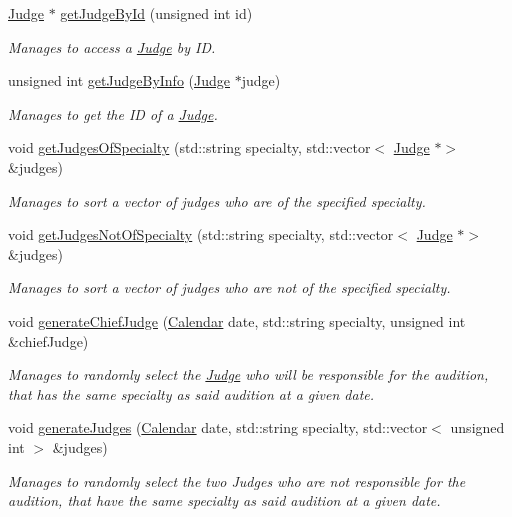 \begin{DoxyCompactItemize}
\hyperlink{class_judge}{Judge} $\ast$ \hyperlink{class_company_ab4135415448c7f20c5db91413ca947fd}{get\+Judge\+By\+Id} (unsigned int id)
\begin{DoxyCompactList}\small\item\em Manages to access a \hyperlink{class_judge}{Judge} by ID. \end{DoxyCompactList}\item 
unsigned int \hyperlink{class_company_a0ea843e026af967b2d4d69d268481cb7}{get\+Judge\+By\+Info} (\hyperlink{class_judge}{Judge} $\ast$judge)
\begin{DoxyCompactList}\small\item\em Manages to get the ID of a \hyperlink{class_judge}{Judge}. \end{DoxyCompactList}\item 
void \hyperlink{class_company_ad8d86971b1fb7acb622c1eef3db1fa4e}{get\+Judges\+Of\+Specialty} (std\+::string specialty, std\+::vector$<$ \hyperlink{class_judge}{Judge} $\ast$$>$ \&judges)
\begin{DoxyCompactList}\small\item\em Manages to sort a vector of judges who are of the specified specialty. \end{DoxyCompactList}\item 
void \hyperlink{class_company_ad8f032997ab625e04324093ac20d83cf}{get\+Judges\+Not\+Of\+Specialty} (std\+::string specialty, std\+::vector$<$ \hyperlink{class_judge}{Judge} $\ast$$>$ \&judges)
\begin{DoxyCompactList}\small\item\em Manages to sort a vector of judges who are not of the specified specialty. \end{DoxyCompactList}\item 
void \hyperlink{class_company_af5121e8ac79b845e06a1c592f9db41d3}{generate\+Chief\+Judge} (\hyperlink{class_calendar}{Calendar} date, std\+::string specialty, unsigned int \&chief\+Judge)
\begin{DoxyCompactList}\small\item\em Manages to randomly select the \hyperlink{class_judge}{Judge} who will be responsible for the audition, that has the same specialty as said audition at a given date. \end{DoxyCompactList}\item 
void \hyperlink{class_company_aa3a5c5f2ea59e01207f1407676a302ef}{generate\+Judges} (\hyperlink{class_calendar}{Calendar} date, std\+::string specialty, std\+::vector$<$ unsigned int $>$ \&judges)
\begin{DoxyCompactList}\small\item\em Manages to randomly select the two Judges who are not responsible for the audition, that have the same specialty as said audition at a given date. \end{DoxyCompactList}\item 

\end{DoxyCompactItemize}
